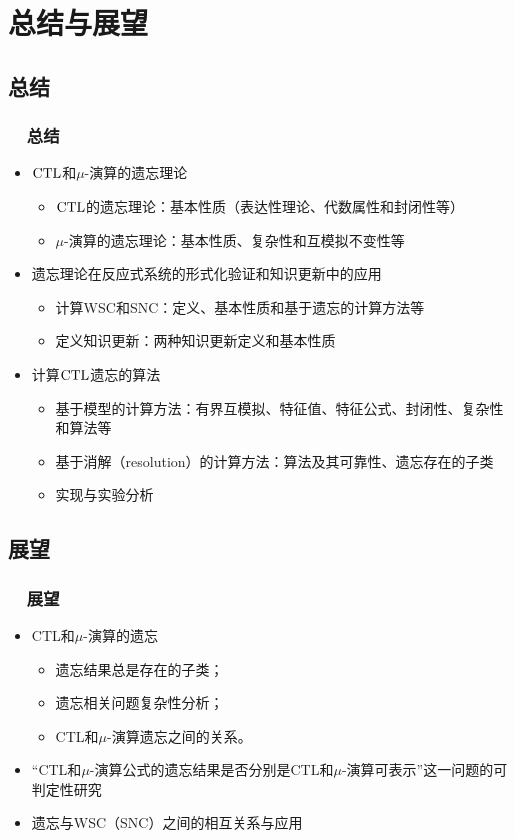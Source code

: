 \documentclass[9pt, CJK]{beamer}
\begin{document}
	
	
	\section{总结与展望}
	\subsection*{总结}
	\begin{frame}
		\frametitle{~~总结}
		\begin{itemize}[<+-| alert@+>]
			\vskip 8pt
			\item $\textrm{CTL}$和$\mu$-演算的遗忘理论
			\begin{itemize}
				\item $\textrm{CTL}$的遗忘理论：基本性质（表达性理论、代数属性和封闭性等）
				\item $\mu$-演算的遗忘理论：基本性质、复杂性和互模拟不变性等
			\end{itemize}
			\item 遗忘理论在反应式系统的形式化验证和知识更新中的应用
			\begin{itemize}
				\item 计算WSC和SNC：定义、基本性质和基于遗忘的计算方法等
				\item 定义知识更新：两种知识更新定义和基本性质
			\end{itemize}
			\item 计算$\textrm{CTL}$遗忘的算法
			\begin{itemize}
				\item 基于模型的计算方法：有界互模拟、特征值、特征公式、封闭性、复杂性和算法等
				\item 基于消解（resolution）的计算方法：算法及其可靠性、遗忘存在的子类
				\item 实现与实验分析
			\end{itemize}
		\end{itemize}
	\end{frame}
	
	\subsection*{展望}
	\begin{frame}
		\frametitle{~~展望}
		\begin{spacing}{1.5}
			\begin{itemize}
				\item CTL和$\mu$-演算的遗忘
				\begin{itemize}
					\item 遗忘结果总是存在的子类；
					\item 遗忘相关问题复杂性分析；
					\item CTL和$\mu$-演算遗忘之间的关系。
				\end{itemize}
				\item “CTL和$\mu$-演算公式的遗忘结果是否分别是CTL和$\mu$-演算可表示”这一问题的可判定性研究
				\item 遗忘与WSC（SNC）之间的相互关系与应用
			\end{itemize}
		\end{spacing}
	\end{frame}
	
\end{document}

